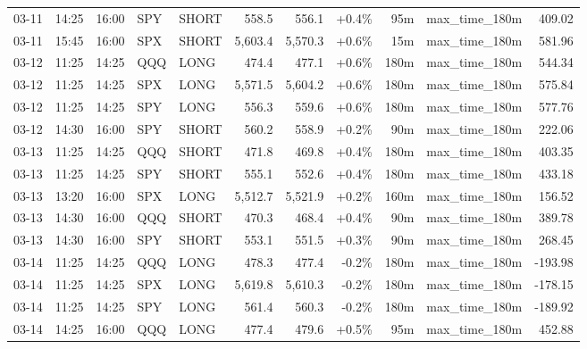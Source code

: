 \documentclass[11pt,a4paper,twoside]{article}
\begin{document}
\begin{center}
\begin{longtable}{>{\color{txtmain}}l l l l l r r r r >{\color{txtmain}}l r}
03-11 & 14:25 & 16:00 & SPY & SHORT & 558.5 & 556.1 & \textcolor{wingreen}{+0.4\%} & 95m & max\_time\_180m & \textcolor{wingreen}{409.02} \\
03-11 & 15:45 & 16:00 & SPX & SHORT & 5,603.4 & 5,570.3 & \textcolor{wingreen}{+0.6\%} & 15m & max\_time\_180m & \textcolor{wingreen}{581.96} \\
03-12 & 11:25 & 14:25 & QQQ & LONG & 474.4 & 477.1 & \textcolor{wingreen}{+0.6\%} & 180m & max\_time\_180m & \textcolor{wingreen}{544.34} \\
03-12 & 11:25 & 14:25 & SPX & LONG & 5,571.5 & 5,604.2 & \textcolor{wingreen}{+0.6\%} & 180m & max\_time\_180m & \textcolor{wingreen}{575.84} \\
03-12 & 11:25 & 14:25 & SPY & LONG & 556.3 & 559.6 & \textcolor{wingreen}{+0.6\%} & 180m & max\_time\_180m & \textcolor{wingreen}{577.76} \\
03-12 & 14:30 & 16:00 & SPY & SHORT & 560.2 & 558.9 & \textcolor{wingreen}{+0.2\%} & 90m & max\_time\_180m & \textcolor{wingreen}{222.06} \\
03-13 & 11:25 & 14:25 & QQQ & SHORT & 471.8 & 469.8 & \textcolor{wingreen}{+0.4\%} & 180m & max\_time\_180m & \textcolor{wingreen}{403.35} \\
03-13 & 11:25 & 14:25 & SPY & SHORT & 555.1 & 552.6 & \textcolor{wingreen}{+0.4\%} & 180m & max\_time\_180m & \textcolor{wingreen}{433.18} \\
03-13 & 13:20 & 16:00 & SPX & LONG & 5,512.7 & 5,521.9 & \textcolor{wingreen}{+0.2\%} & 160m & max\_time\_180m & \textcolor{wingreen}{156.52} \\
03-13 & 14:30 & 16:00 & QQQ & SHORT & 470.3 & 468.4 & \textcolor{wingreen}{+0.4\%} & 90m & max\_time\_180m & \textcolor{wingreen}{389.78} \\
03-13 & 14:30 & 16:00 & SPY & SHORT & 553.1 & 551.5 & \textcolor{wingreen}{+0.3\%} & 90m & max\_time\_180m & \textcolor{wingreen}{268.45} \\
03-14 & 11:25 & 14:25 & QQQ & LONG & 478.3 & 477.4 & \textcolor{lossred}{-0.2\%} & 180m & max\_time\_180m & \textcolor{lossred}{-193.98} \\
03-14 & 11:25 & 14:25 & SPX & LONG & 5,619.8 & 5,610.3 & \textcolor{lossred}{-0.2\%} & 180m & max\_time\_180m & \textcolor{lossred}{-178.15} \\
03-14 & 11:25 & 14:25 & SPY & LONG & 561.4 & 560.3 & \textcolor{lossred}{-0.2\%} & 180m & max\_time\_180m & \textcolor{lossred}{-189.92} \\
03-14 & 14:25 & 16:00 & QQQ & LONG & 477.4 & 479.6 & \textcolor{wingreen}{+0.5\%} & 95m & max\_time\_180m & \textcolor{wingreen}{452.88} \\

\end{longtable}
\end{center}
\end{document}
